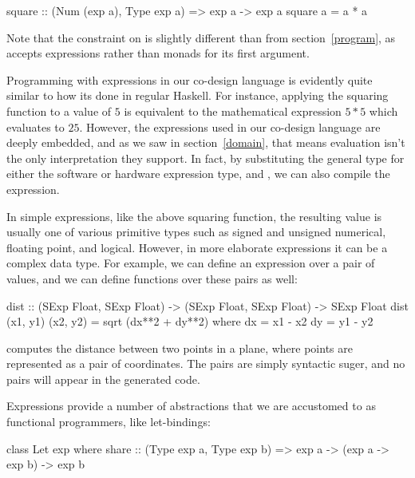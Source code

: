 \documentclass[../paper.tex]{subfiles}
\begin{document}
\begin{code}
square :: (Num (exp a), Type exp a) => exp a -> exp a
square a = a * a
\end{code}

\noindent Note that the  constraint on  is slightly different than  from section~\ref{program}, as  accepts expressions rather than monads for its first argument.


Programming with expressions in our co-design language is evidently quite similar to how its done in regular Haskell. For instance, applying the squaring function to a value of $5$ is equivalent to the mathematical expression $5*5$ which evaluates to $25$. However, the expressions used in our co-design language are deeply embedded, and as we saw in section~\ref{domain}, that means evaluation isn't the only interpretation they support. In fact, by substituting the general  type for either the software or hardware expression type,  and , we can also compile the expression.

In simple expressions, like the above squaring function, the resulting value is usually one of various primitive types such as signed and unsigned numerical, floating point, and logical. However, in more elaborate expressions it can be a complex data type. For example, we can define an expression over a pair of values, and we can define functions over these pairs as well:

\begin{code}
dist :: (SExp Float, SExp Float) -> (SExp Float, SExp Float) -> SExp Float
dist (x1, y1) (x2, y2) = sqrt (dx**2 + dy**2)
  where
    dx = x1 - x2
    dy = y1 - y2
\end{code}

 computes the distance between two points in a plane, where points are represented as a pair of coordinates. The pairs are simply syntactic suger, and no pairs will appear in the generated code.

Expressions provide a number of abstractions that we are accustomed to as functional programmers, like let-bindings:

\begin{code}
class Let exp where
  share :: (Type exp a, Type exp b) => exp a -> (exp a -> exp b) -> exp b
\end{code}
\end{document}
